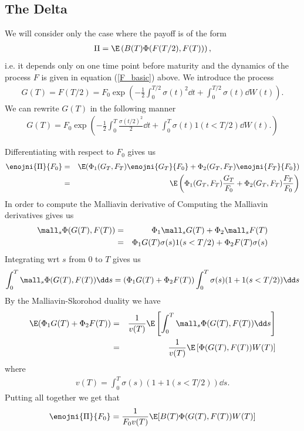 
\subsection {The Delta}
\label {path_dep_delta}

We will consider only the case where the payoff is of the form 
\begin {eqnarray*}
  \Pi = \E \left( B(T) \Phi ( F ( T/2) , F(T) ) \right), 
\end {eqnarray*}
i.e. it depends only on one time point before maturity and 
the dynamics of the process $F$ is given in equation (\ref{F_basic}) above. 
%
We introduce the process 
\begin {eqnarray*}
  G(T) = F (T/2) = F_0 \exp \left( - \frac 1 2 \int_0^{T/2} \sigma(t)^2 \dd t + \int_0^{T/2} \sigma (t) \dd W(t) 
  \right) .
\end {eqnarray*}
We can rewrite $G(T)$ in the following manner 
\begin {eqnarray*}
  G(T) = F_0 \exp \left( 
  - \frac 1 2 \int_0^T \frac {\sigma (t/2)^2} {2} \dd t + \int_0^T \sigma (t) 1 (t < T/2) \dd W (t) .
  \right) 
\end {eqnarray*}

Differentiating with respect to $F_0$ gives us 
\begin {eqnarray*}
  \enojni {\Pi} {F_0} & = & \E ( \Phi_1 (G_T, F_T) \enojni {G_T} {F_0} + \Phi_2 (G_T, F_T) \enojni {F_T} {F_0} ) 
  \\
  & = &  \E \left( \Phi_1 (G_T, F_T) \frac {G_T}{F_0} + \Phi_2 (G_T, F_T) \frac {F_T}{F_0} \right) 
\end {eqnarray*}
In order to compute the Malliavin derivative of Computing the Malliavin derivatives gives us 
\begin {eqnarray*}
  \mall_s \Phi ( G(T), F(T) ) & = & \Phi_1 \mall _s G(T) + \Phi_2 \mall_s F(T) 
  \\
  & = & \Phi_1 G(T) \sigma (s) 1 (s < T/2) + \Phi_2 F(T) \sigma(s)
\end {eqnarray*}
Integrating wrt $s$ from $0$ to $T$ gives us 
\begin {eqnarray*}
  \int_0^T \mall_s \Phi ( G(T), F(T) ) \dd s = ( \Phi_1 G(T) + \Phi_2 F(T) ) 
  \int_0^T \sigma (s) ( 1 + 1 (s < T/2) ) \dd s 
\end {eqnarray*}
By the Malliavin-Skorohod duality we have 
\begin {eqnarray*}
  \E ( \Phi_1 G(T) + \Phi_2 F(T) ) & = & \frac 1 {v(T)} 
  \E \left[ \int_0^T \mall_s \Phi ( G(T), F(T) ) \dd s \right] 
  \\
  & = & \frac 1 {v(T)} \E \left[ \Phi (G(T), F(T)) W(T) \right] 
\end {eqnarray*}
where 
\begin {eqnarray*}
  v(T) = \int_0^T \sigma (s) ( 1 + 1 (s < T/2) ) \dd s .
\end {eqnarray*}
Putting all together we get that 
\begin {eqnarray*}
  \enojni {\Pi} {F_0} = \frac {1} {F_0 v(T)} \E [ B(T) \Phi (G(T), F(T)) W(T) ]
\end {eqnarray*}

